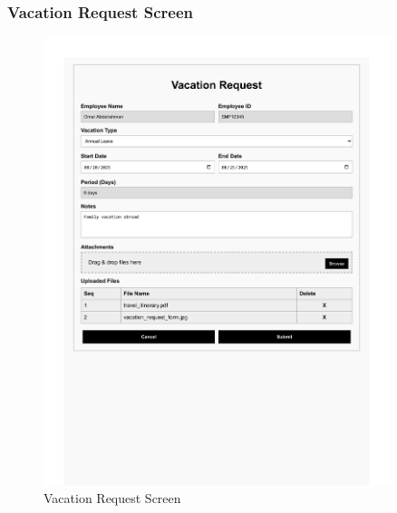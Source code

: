 \documentclass[12pt,a4paper]{article}
\begin{document}
\subsubsection{Vacation Request Screen}
\begin{figure}[H]
\centering
\includegraphics[width=0.9\textwidth]{Wireframes/Vacation-Request/Vacation-Request-1.png}
\caption{Vacation Request Screen}
\label{fig:vacation-request-screen}
\end{figure}
\end{document}
